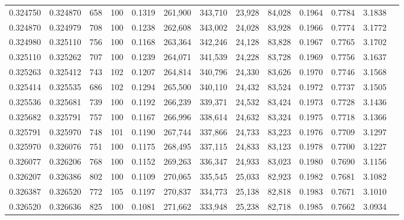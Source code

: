 \begin{tabular}{rrrrrrrrrrrrr}
0.324750 & 0.324870 &   658 & 100 &                                     0.1319 & 261,900 & 343,710 &  23,928 &  84,028 & 0.1964 & 0.7784 & 3.1838 \\
0.324870 & 0.324979 &   708 & 100 &                                     0.1238 & 262,608 & 343,002 &  24,028 &  83,928 & 0.1966 & 0.7774 & 3.1772 \\
0.324980 & 0.325110 &   756 & 100 &                                     0.1168 & 263,364 & 342,246 &  24,128 &  83,828 & 0.1967 & 0.7765 & 3.1702 \\
0.325110 & 0.325262 &   707 & 100 &                                     0.1239 & 264,071 & 341,539 &  24,228 &  83,728 & 0.1969 & 0.7756 & 3.1637 \\
0.325263 & 0.325412 &   743 & 102 &                                     0.1207 & 264,814 & 340,796 &  24,330 &  83,626 & 0.1970 & 0.7746 & 3.1568 \\
0.325414 & 0.325535 &   686 & 102 &                                     0.1294 & 265,500 & 340,110 &  24,432 &  83,524 & 0.1972 & 0.7737 & 3.1505 \\
0.325536 & 0.325681 &   739 & 100 &                                     0.1192 & 266,239 & 339,371 &  24,532 &  83,424 & 0.1973 & 0.7728 & 3.1436 \\
0.325682 & 0.325791 &   757 & 100 &                                     0.1167 & 266,996 & 338,614 &  24,632 &  83,324 & 0.1975 & 0.7718 & 3.1366 \\
0.325791 & 0.325970 &   748 & 101 &                                     0.1190 & 267,744 & 337,866 &  24,733 &  83,223 & 0.1976 & 0.7709 & 3.1297 \\
0.325970 & 0.326076 &   751 & 100 &                                     0.1175 & 268,495 & 337,115 &  24,833 &  83,123 & 0.1978 & 0.7700 & 3.1227 \\
0.326077 & 0.326206 &   768 & 100 &                                     0.1152 & 269,263 & 336,347 &  24,933 &  83,023 & 0.1980 & 0.7690 & 3.1156 \\
0.326207 & 0.326386 &   802 & 100 &                                     0.1109 & 270,065 & 335,545 &  25,033 &  82,923 & 0.1982 & 0.7681 & 3.1082 \\
0.326387 & 0.326520 &   772 & 105 &                                     0.1197 & 270,837 & 334,773 &  25,138 &  82,818 & 0.1983 & 0.7671 & 3.1010 \\
0.326520 & 0.326636 &   825 & 100 &                                     0.1081 & 271,662 & 333,948 &  25,238 &  82,718 & 0.1985 & 0.7662 & 3.0934 \\

\end{tabular}
